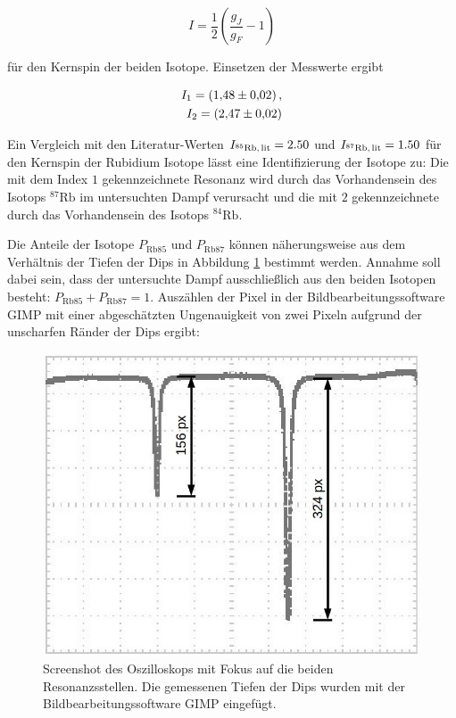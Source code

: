 \begin{equation}
	I = \frac{1}{2} \left(\frac{g_J}{g_F} - 1\right)
\end{equation}

für den Kernspin der beiden Isotope. Einsetzen der Messwerte ergibt

\begin{eqnarray}
	I_1 = \SI{1.48 \pm 0.02},\\
	I_2 = \SI{2.47 \pm 0.02}.
\end{eqnarray}

Ein Vergleich mit den Literatur-Werten $I_{{}^{85}\text{Rb,\,lit}} = 2.50$ und $I_{{}^{87}\text{Rb,\,lit}} = 1.50$ \cite{Rb} für den Kernspin der Rubidium Isotope lässt eine Identifizierung der Isotope zu: Die mit dem Index $1$ gekennzeichnete Resonanz wird durch das Vorhandensein des Isotops ${}^{87}\text{Rb}$ im untersuchten Dampf verursacht und die mit $2$ gekennzeichnete durch das Vorhandensein des Isotops ${}^{84}\text{Rb}$.

Die Anteile der Isotope $P_{\text{Rb}85}$ und $P_{\text{Rb}87}$ können näherungsweise aus dem Verhältnis der Tiefen der Dips in Abbildung \ref{fig:oszi2_3} bestimmt werden. Annahme soll dabei sein, dass der untersuchte Dampf ausschließlich aus den beiden Isotopen besteht: $P_{\text{Rb}85} + P_{\text{Rb}87} = 1$. Auszählen der Pixel in der Bildbearbeitungssoftware GIMP \cite{Gimp} mit einer abgeschätzten Ungenauigkeit von zwei Pixeln aufgrund der unscharfen Ränder der Dips ergibt:


\begin{figure}
	\centering
	\includegraphics[width=0.7\linewidth]{img/oszi2_3}
	\caption{Screenshot des Oszilloskops mit Fokus auf die beiden Resonanzsstellen. Die gemessenen Tiefen der Dips wurden mit der Bildbearbeitungssoftware GIMP eingefügt.}
	\label{fig:oszi2_3}
\end{figure}

